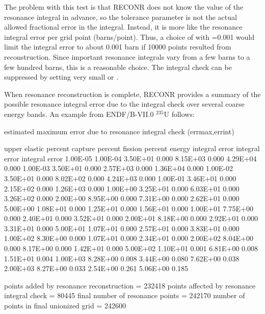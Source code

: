The problem with this test is that RECONR does not know the value
of the resonance integral in advance, so the tolerance parameter
 is not the actual allowed fractional error in the
integral.  Instead, it is more like the resonance integral error
per grid point (barns/point).  Thus, a choice of
 with =0.001 would limit the
integral error to about 0.001 barn if 10000 points resulted from
reconstruction.  Since important resonance integrals vary from a
few barns to a few hundred barns, this is a reasonable choice.
The integral check can be suppressed by setting 
very small or .

When resonance reconstruction is complete, RECONR provides a
summary of the possible resonance integral error due to the
integral check over several coarse energy bands.  An example
from ENDF/B-VII.0 $^{235}$U follows:

\newpage
\small
\begin{ccode}

               estimated maximum error due to
               resonance integral check (errmax,errint)

    upper      elastic   percent   capture   percent   fission   percent
    energy     integral   error    integral   error    integral   error
  1.00E-05
  1.00E-04     3.50E+01   0.000    8.15E+03   0.000    4.29E+04   0.000
  1.00E-03     3.50E+01   0.000    2.57E+03   0.000    1.36E+04   0.000
  1.00E-02     3.50E+01   0.000    8.02E+02   0.000    4.24E+03   0.000
  1.00E-01     3.46E+01   0.000    2.15E+02   0.000    1.26E+03   0.000
  1.00E+00     3.25E+01   0.000    6.03E+01   0.000    3.26E+02   0.000
  2.00E+00     8.95E+00   0.000    7.31E+00   0.000    2.62E+01   0.000
  5.00E+00     1.08E+01   0.000    1.25E+01   0.000    1.56E+01   0.000
  1.00E+01     7.75E+00   0.000    2.40E+01   0.000    3.52E+01   0.000
  2.00E+01     8.18E+00   0.000    2.92E+01   0.000    3.31E+01   0.000
  5.00E+01     1.07E+01   0.000    2.57E+01   0.000    3.83E+01   0.000
  1.00E+02     8.30E+00   0.000    1.07E+01   0.000    2.34E+01   0.000
  2.00E+02     8.04E+00   0.000    8.17E+00   0.000    1.42E+01   0.000
  5.00E+02     1.10E+01   0.001    6.81E+00   0.008    1.51E+01   0.004
  1.00E+03     8.28E+00   0.008    3.44E+00   0.080    7.62E+00   0.038
  2.00E+03     8.27E+00   0.033    2.54E+00   0.261    5.06E+00   0.185

 points added by resonance reconstruction    =  232418
 points affected by resonance integral check =   80445
 final number of resonance points            =  242170
 number of points in final unionized grid    =  242600

\end{ccode}
\normalsize

